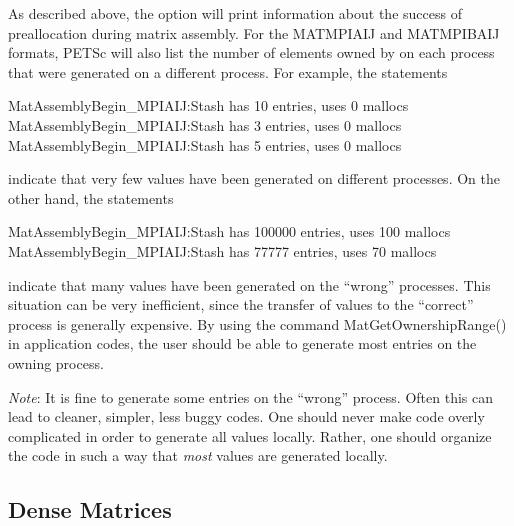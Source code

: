 As described above, the option  
will print information about the success of preallocation during
matrix assembly.  For the MATMPIAIJ and MATMPIBAIJ formats, PETSc will also list
the number of elements owned by on each process that were generated
on a different process.  For example, the statements
\begin{tabbing}
   MatAssemblyBegin\_MPIAIJ:Stash has 10 entries, uses 0 mallocs \\
   MatAssemblyBegin\_MPIAIJ:Stash has 3 entries, uses 0 mallocs \\
   MatAssemblyBegin\_MPIAIJ:Stash has 5 entries, uses 0 mallocs 
\end{tabbing}
indicate that very few values have been generated on different processes.
On the other hand, the statements
\begin{tabbing}
   MatAssemblyBegin\_MPIAIJ:Stash has 100000 entries, uses 100 mallocs \\
   MatAssemblyBegin\_MPIAIJ:Stash has 77777 entries, uses 70 mallocs
\end{tabbing}
indicate that many values have been generated on the ``wrong'' processes.
This situation can be very inefficient, since the transfer of values
to the ``correct'' process is generally expensive.  By using the command
MatGetOwnershipRange() in application codes, the user should be able
to generate most entries on the owning process.

{\em Note}: It is fine to generate some entries on the ``wrong'' process. Often
this can lead to cleaner, simpler, less buggy codes.  One should never
make code overly complicated in order to generate all values locally. Rather,
one should organize the code in such a way that {\em most} values are generated locally.

\subsection{Dense Matrices}
\label{sec_matdense}

